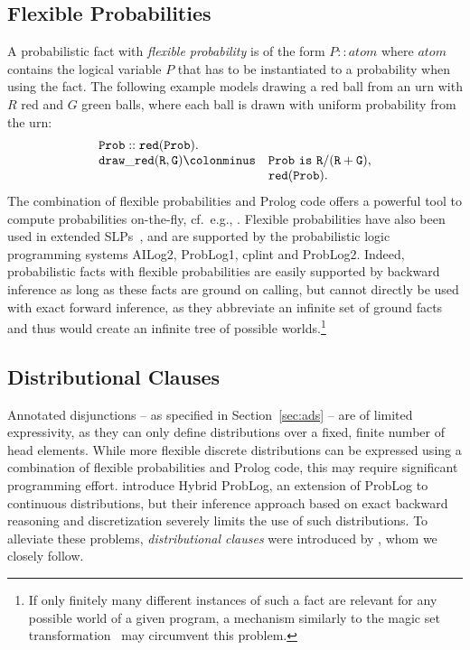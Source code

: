 \documentclass[a4paper]{article}
\begin{document}
\subsection{Flexible Probabilities}
A probabilistic fact with \emph{flexible probability} is of the form
$P::atom$ where $atom$ contains the logical variable $P$ that has to be instantiated to a probability when using the fact. The following example models drawing a red ball from an urn with $R$ red and $G$ green balls, where each ball is drawn with uniform probability from the urn:
\begin{equation*}
\begin{array}{ll}
\mathtt{Prob::red(Prob).}\\
\mathtt{draw\_red(R,G)}  \mathtt{\colonminus} & \mathtt{Prob\ is\ R/(R+G),}\\
& \mathtt{ red(Prob).}
\end{array}
\end{equation*}
The combination of flexible probabilities and Prolog code offers a
powerful tool to compute probabilities on-the-fly, cf.~e.g., \citep{Poole08}. 
Flexible probabilities have also been used in extended
SLPs~\citep{Angelopoulos04}, and are supported by the probabilistic
logic programming systems AILog2, ProbLog1, cplint and ProbLog2. 
Indeed, probabilistic facts with flexible probabilities are easily
supported by backward inference as long as
these facts are ground on calling, but cannot directly be used
with exact forward inference, as they abbreviate an infinite set of ground
facts and thus would create an infinite tree of possible worlds.\footnote{If
only finitely many different instances of such a fact are relevant for
any possible world of a given program, a mechanism similarly to the magic set
transformation~\citep{bancilhon:pods86} may circumvent this problem.}



\subsection{Distributional Clauses}
\label{sec:dc}

Annotated disjunctions -- as specified in Section~\ref{sec:ads} -- are
of limited expressivity, as they can only define distributions over a
fixed, finite number of head elements. 
While more flexible discrete distributions can be
expressed using a combination of flexible probabilities and Prolog
code, this may require significant programming
effort. \cite{gutmann:ilp10} introduce Hybrid ProbLog, an
extension of ProbLog to continuous distributions, but their
inference approach based on exact backward reasoning and
discretization severely limits  the use of such distributions. 
 To alleviate these problems, \emph{distributional clauses} were introduced by \cite{Gutmann11}, whom we closely follow.
\end{document}
